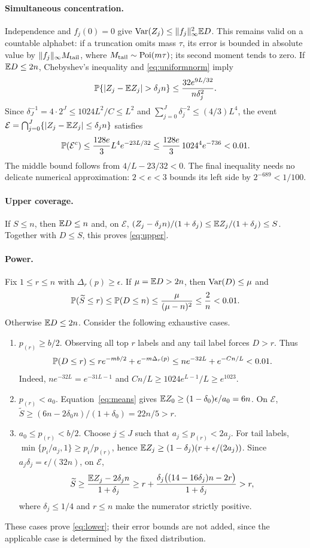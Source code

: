 \paragraph{Simultaneous concentration.}
Independence and $f_j(0)=0$ give
$\operatorname{Var}(Z_j)\le\|f_j\|_\infty^2\mathbb E D$.
This remains valid on a countable alphabet: if a truncation omits mass
$\tau$, its error is bounded in absolute value by $\|f_j\|_\infty M_{\rm tail}$,
where $M_{\rm tail}\sim\operatorname{Poi}(m\tau)$; its second moment tends to zero.
If $\mathbb E D\le2n$, Chebyshev's inequality and \eqref{eq:uniformnorm} imply
\[
 \Prob\{|Z_j-\E Z_j|>\delta_jn\}
 \le\frac{32e^{9L/32}}{n\delta_j^2}.
\]
Since $\delta_J^{-1}=4\cdot2^J\le1024L^2/C\le L^2$ and
$\sum_{j=0}^J\delta_j^{-2}\le(4/3)L^4$, the event
$\mathcal E=\bigcap_{j=0}^J\{|Z_j-\mathbb E Z_j|\le\delta_jn\}$ satisfies
\begin{equation}
 \mathbb P(\mathcal E^c)\le\frac{128e}{3}L^4e^{-23L/32}
 \le\frac{128e}{3}\,1024^4e^{-736}<0.01.
 \label{eq:concentration}
\end{equation}
The middle bound follows from $4/L-23/32<0$. The final inequality needs
no delicate numerical approximation: $2<e<3$ bounds its left side by
$2^{-689}<1/100$.

\paragraph{Upper coverage.}
If $S\le n$, then $\mathbb E D\le n$ and, on $\mathcal E$,
$(Z_j-\delta_jn)/(1+\delta_j)\le\mathbb E Z_j/(1+\delta_j)\le S$.
Together with $D\le S$, this proves \eqref{eq:upper}.

\paragraph{Power.}
Fix $1\le r\le n$ with $\Delta_r(p)\ge\epsilon$. If $\mu=\mathbb E D>2n$,
then $\operatorname{Var}(D)\le\mu$ and
\[
 \mathbb P(\widetilde S\le r)\le\mathbb P(D\le n)
 \le\frac{\mu}{(\mu-n)^2}\le\frac2n<0.01.
\]
Otherwise $\mathbb E D\le2n$. Consider the following exhaustive cases.
\begin{enumerate}[label=(\roman*)]
\item $p_{(r)}\ge b/2$. Observing all top $r$ labels and any tail label
forces $D>r$. Thus
\[
 \mathbb P(D\le r)\le re^{-mb/2}+e^{-m\Delta_r(p)}
 \le ne^{-32L}+e^{-Cn/L}<0.01.
\]
Indeed, $ne^{-32L}=e^{-31L-1}$ and
$Cn/L\ge1024e^{L-1}/L\ge e^{1023}$.
\item $p_{(r)}<a_0$. Equation~\eqref{eq:means} gives
$\mathbb E Z_0\ge(1-\delta_0)\epsilon/a_0=6n$. On $\mathcal E$,
$\widetilde S\ge(6n-2\delta_0n)/(1+\delta_0)=22n/5>r$.
\item $a_0\le p_{(r)}<b/2$. Choose $j\le J$ such that
$a_j\le p_{(r)}<2a_j$. For tail labels,
$\min\{p_i/a_j,1\}\ge p_i/p_{(r)}$, hence
$\mathbb E Z_j\ge(1-\delta_j)(r+\epsilon/(2a_j))$. Since
$a_j\delta_j=\epsilon/(32n)$, on $\mathcal E$,
\[
 \widetilde S\ge\frac{\mathbb E Z_j-2\delta_jn}{1+\delta_j}
 \ge r+\frac{\delta_j\bigl((14-16\delta_j)n-2r\bigr)}{1+\delta_j}>r,
\]
where $\delta_j\le1/4$ and $r\le n$ make the numerator strictly positive.
\end{enumerate}
These cases prove \eqref{eq:lower}; their error bounds are not added,
since the applicable case is determined by the fixed distribution.

